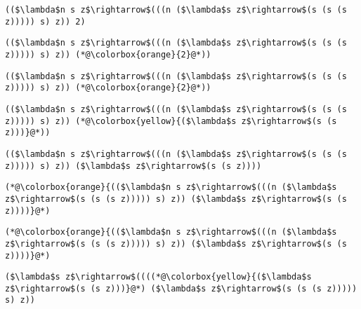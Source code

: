 \documentclass{beamer}
\begin{document}
\begin{frame}[fragile]{\CurrentSection}
\lstset{basicstyle=\ttfamily\small}\lstset{numbers=none}\lstset{language=ML}\begin{lstlisting}
(($\lambda$n s z$\rightarrow$(((n ($\lambda$s z$\rightarrow$(s (s (s z))))) s) z)) 2)
\end{lstlisting}
\pause\lstset{language=ML}\begin{lstlisting}
(($\lambda$n s z$\rightarrow$(((n ($\lambda$s z$\rightarrow$(s (s (s z))))) s) z)) (*@\colorbox{orange}{2}@*))
\end{lstlisting}

\end{frame}

\begin{frame}[fragile]{\CurrentSection}
\lstset{basicstyle=\ttfamily\small}\lstset{numbers=none}\lstset{language=ML}\begin{lstlisting}
(($\lambda$n s z$\rightarrow$(((n ($\lambda$s z$\rightarrow$(s (s (s z))))) s) z)) (*@\colorbox{orange}{2}@*))
\end{lstlisting}
\pause\lstset{language=ML}\begin{lstlisting}
(($\lambda$n s z$\rightarrow$(((n ($\lambda$s z$\rightarrow$(s (s (s z))))) s) z)) (*@\colorbox{yellow}{($\lambda$s z$\rightarrow$(s (s z)))}@*))
\end{lstlisting}

\end{frame}

\begin{frame}[fragile]{\CurrentSection}
\lstset{basicstyle=\ttfamily\small}\lstset{numbers=none}\lstset{language=ML}\begin{lstlisting}
(($\lambda$n s z$\rightarrow$(((n ($\lambda$s z$\rightarrow$(s (s (s z))))) s) z)) ($\lambda$s z$\rightarrow$(s (s z))))
\end{lstlisting}
\pause\lstset{language=ML}\begin{lstlisting}
(*@\colorbox{orange}{(($\lambda$n s z$\rightarrow$(((n ($\lambda$s z$\rightarrow$(s (s (s z))))) s) z)) ($\lambda$s z$\rightarrow$(s (s z))))}@*)
\end{lstlisting}

\end{frame}

\begin{frame}[fragile]{\CurrentSection}
\lstset{basicstyle=\ttfamily\small}\lstset{numbers=none}\lstset{language=ML}\begin{lstlisting}
(*@\colorbox{orange}{(($\lambda$n s z$\rightarrow$(((n ($\lambda$s z$\rightarrow$(s (s (s z))))) s) z)) ($\lambda$s z$\rightarrow$(s (s z))))}@*)
\end{lstlisting}
\pause\lstset{language=ML}\begin{lstlisting}
($\lambda$s z$\rightarrow$((((*@\colorbox{yellow}{($\lambda$s z$\rightarrow$(s (s z)))}@*) ($\lambda$s z$\rightarrow$(s (s (s z))))) s) z))
\end{lstlisting}

\end{frame}
\end{document}
